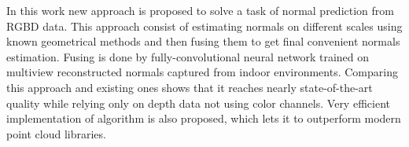 In this work new approach is proposed to solve a task of normal prediction from RGBD data. This approach consist of estimating normals on different scales using known geometrical methods and then fusing them to get final convenient normals estimation. Fusing is done by fully-convolutional neural network trained on multiview reconstructed normals captured from indoor environments. Comparing this approach and existing ones shows that it reaches nearly state-of-the-art quality while relying only on depth data not using color channels. Very efficient implementation of algorithm is also proposed, which lets it to outperform modern point cloud libraries.